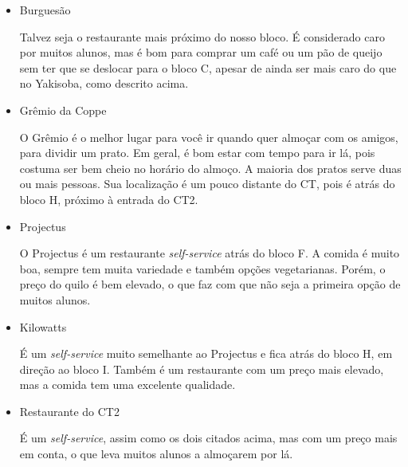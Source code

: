     \begin{itemize}
    \item Burguesão
    
    Talvez seja o restaurante mais próximo do nosso bloco. É considerado caro por muitos alunos, mas é bom para comprar um café ou um pão de queijo sem ter que se deslocar para o bloco C, apesar de ainda ser mais caro do que no Yakisoba, como descrito acima.
    
     \item Grêmio da Coppe
    
    O Grêmio é o melhor lugar para você ir quando quer almoçar com os amigos, para dividir um prato. Em geral, é bom estar com tempo para ir lá, pois costuma ser bem cheio no horário do almoço. A maioria dos pratos serve duas ou mais pessoas.
    Sua localização é um pouco distante do CT, pois é atrás do bloco H, próximo à entrada do CT2.
    
    \item Projectus
    
    O Projectus é um restaurante \textit{self-service} atrás do bloco F. A comida é muito boa, sempre tem muita variedade e também opções vegetarianas. Porém, o preço do quilo é bem elevado, o que faz com que não seja a primeira opção de muitos alunos.
    
    \item Kilowatts
    
    É um \textit{self-service} muito semelhante ao Projectus e fica atrás do bloco H, em direção ao bloco I. Também é um restaurante com um preço mais elevado, mas a comida tem uma excelente qualidade.
    
    \item Restaurante do CT2
    
    É um \textit{self-service}, assim como os dois citados acima, mas com um preço mais em conta, o que leva muitos alunos a almoçarem por lá.
    \end{itemize}
    
    
